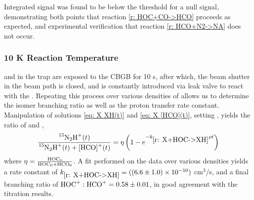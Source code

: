 Integrated  signal was found to be below the threshold for a null signal, demonstrating both points that reaction \ref{r: HOC+CO->HCO} proceeds as expected, and experimental verification that reaction \ref{r: HCO+N2->NA} does not occur.

\subsubsection{10 K Reaction Temperature}

 and  in the trap are exposed to the CBGB for 10 s, after which, the beam shutter in the beam path is closed, and  is constantly introduced via leak valve to react with the . Repeating this process over various densities of  allows us to determine the isomer branching ratio as well as the proton transfer rate constant. Manipulation of solutions \ref{eq: X XH(t)} and \ref{eq: X [HCO](t)}, setting , yields the ratio of  and \ce{[HCO]+},
\begin{align}
	\frac{\ce{^{15}N2H+}(t)}{\ce{^{15}N2H+}(t)+\ce{[HCO]+}(t)} = \eta \left( 1-e^{-k_{\ref{r: X+HOC->XH}} \rho t} \right) \label{eq: N2 asymptote}
\end{align}
where $\eta = \frac{\ce{HOC0}}{\ce{HOC0}+\ce{HCO0}}$. A fit performed on the data over various densities yields a rate constant of $k_{\ref{r: X+HOC->XH}} = ((6.6 \pm 1.0) \times 10^{-10})$ cm$^3$/s, and a final branching ratio of $\ce{HOC+}:\ce{HCO+} = 0.58 \pm 0.01$, in good agreement with the  titration results.

